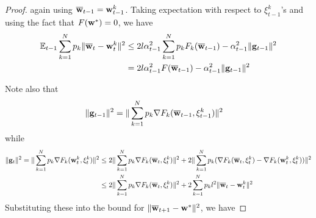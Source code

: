 \begin{proof}
\begin{comment}
	\end{cases}
	\end{align*}
	\begin{align*}
	\sum_{k=1}^{N}p_{k}\|\ov{w}_{t}-\vw_{t}^{k}\|^{2} & =\sum_{k=1}^{N}p_{k}\|\ov{w}_{t-1}-\alpha_{t-1}\vg_{t-1}+\beta_{t-1}(\ov{v}_{t}-\ov{v}_{t-1})-\ov{w}_{t-1}+\alpha_{t-1}\vg_{t-1,k}-\beta_{t-1}(v_{t}-\ov{v}_{t-1})\|^{2}\\
	& =\sum_{k=1}^{N}p_{k}\|-\alpha_{t-1}\vg_{t-1}+\alpha_{t-1}\vg_{t-1,k}+\beta_{t-1}(\ov{v}_{t}-v_{t})\|^{2}\\
	& =\sum_{k=1}^{N}p_{k}\|-\alpha_{t-1}\vg_{t-1}+\alpha_{t-1}\vg_{t-1,k}+\beta_{t-1}(\ov{w}_{t-1}-\alpha_{t-1}\vg_{t-1}-\ov{w}_{t-1}-\alpha_{t-1}\vg_{t-1,k})\|^{2}\\
	& =\alpha_{t-1}^{2}(1+\beta_{t-1})^{2}\sum_{k=1}^{N}p_{k}\|\vg_{t-1}-\vg_{t-1,k}\|^{2}
	\end{align*}
	\end{comment}
	again using ${\overline{\mathbf{w}}}_{t-1}={\mathbf{w}}_{t-1}^{k}$. Taking expectation
	with respect to $\xi_{t-1}^{k}$'s and using the fact that $F({\mathbf{w}}^{\ast})=0$,
	we have 
	\begin{align*}
	\mathbb{E}_{t-1}\sum_{k=1}^{N}p_{k}\|{\overline{\mathbf{w}}}_{t}-{\mathbf{w}}_{t}^{k}\|^{2} & \leq2l\alpha_{t-1}^{2}\sum_{k=1}^{N}p_{k}F_{k}({\overline{\mathbf{w}}}_{t-1})-\alpha_{t-1}^{2}\|{\mathbf{g}}_{t-1}\|^{2}\\
	& =2l\alpha_{t-1}^{2}F({\overline{\mathbf{w}}}_{t-1})-\alpha_{t-1}^{2}\|{\mathbf{g}}_{t-1}\|^{2}
	\end{align*}
	
	Note also that 
	\begin{align*}
	\|{\mathbf{g}}_{t-1}\|^{2} & =\|\sum_{k=1}^{N}p_{k}\nabla F_{k}({\overline{\mathbf{w}}}_{t-1},\xi_{t-1}^{k})\|^{2}
	\end{align*}
	while
	\begin{align*}
	\|{\mathbf{g}}_{t}\|^{2}=\|\sum_{k=1}^{N}p_{k}\nabla F_{k}({\mathbf{w}}_{t}^{k},\xi_{t}^{k})\|^{2} & \leq2\|\sum_{k=1}^{N}p_{k}\nabla F_{k}({\overline{\mathbf{w}}}_{t},\xi_{t}^{k})\|^{2}+2\|\sum_{k=1}^{N}p_{k}(\nabla F_{k}({\overline{\mathbf{w}}}_{t},\xi_{t}^{k})-\nabla F_{k}({\mathbf{w}}_{t}^{k},\xi_{t}^{k}))\|^{2}\\
	& \leq2\|\sum_{k=1}^{N}p_{k}\nabla F_{k}({\overline{\mathbf{w}}}_{t},\xi_{t}^{k})\|^{2}+2\sum_{k=1}^{N}p_{k}l^{2}\|{\overline{\mathbf{w}}}_{t}-{\mathbf{w}}_{t}^{k}\|^{2}
	\end{align*}
	Substituting these into the bound for $\|{\overline{\mathbf{w}}}_{t+1}-{\mathbf{w}}^{\ast}\|^{2}$,
	we have 
	

\end{proof}
